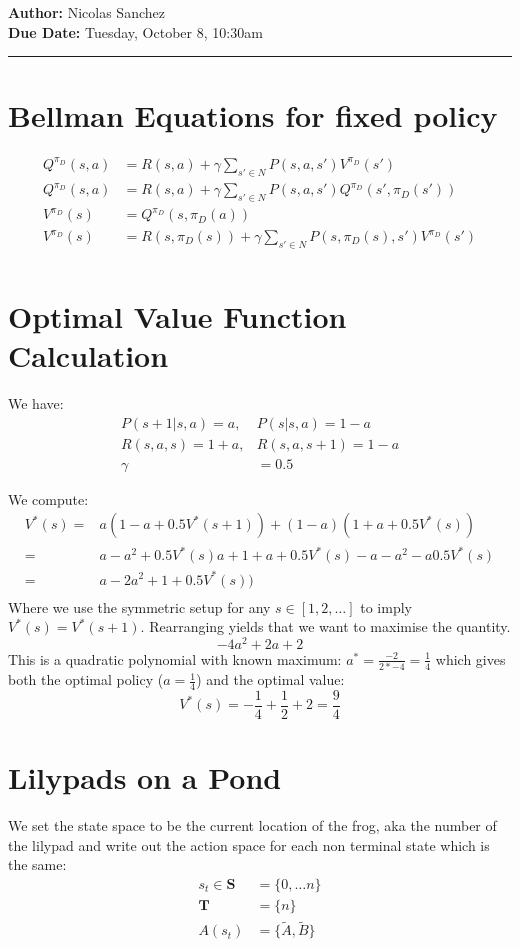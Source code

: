 \documentclass{article}[12pt]
\newcommand{\headings}[4]{\noindent {\bf Assignment 3 CME241} \hfill {{\bf Author:} Nicolas Sanchez} \\
{} \hfill {{\bf Due Date:} #2} \\

\rule[0.1in]{\textwidth}{0.025in}
}
\begin{document}
\headings{\#1}{Tuesday, October 8, 10:30am}\section{} 



\section{Bellman Equations for fixed policy}
\begin{align*}
Q^{\pi_D}(s,a) &= R(s,a) + \gamma \sum_{s'\in N} P(s,a,s')V^{\pi_D}(s')\\
Q^{\pi_D}(s,a) &= R(s,a) + \gamma \sum_{s'\in N} P(s,a,s')Q^{\pi_D}(s',\pi_D(s'))\\
V^{\pi_D}(s) &=  Q^{\pi_D}(s,\pi_D(a)) \\
V^{\pi_D}(s)  &= R(s,\pi_D(s)) + \gamma \sum_{s'\in N} P(s,\pi_D(s),s')V^{\pi_D}(s')\\
\end{align*}


\section{Optimal Value Function Calculation}

We have:
\begin{align*}
P(s+1|s,a) = a,&P(s|s,a) = 1-a\\
R(s,a,s) = 1+a,& R(s,a,s+1) = 1-a\\
\gamma &= 0.5
\end{align*}

We compute:
\begin{align*}
V^*(s) =&  a(1-a + 0.5V^*(s+1) ) + (1-a)(1+a + 0.5V^*(s)) \\
	=&a-a^2+0.5V^*(s)a + 1 + a + 0.5 V^*(s) - a - a^2-a0.5V^*(s)\\
	=&a-2a^2 + 1 + 0.5 V^*(s))\\	
\end{align*}
Where we use the symmetric setup for any $s\in[1,2,\ldots]$ to imply $V^*(s) = V^*(s+1)$. Rearranging yields that we want to maximise the quantity.
$$ -4a^2 + 2a + 2 $$
This is a quadratic polynomial with known maximum: $a^* = \frac{-2}{2*-4} = \frac{1}{4}$ which gives both the optimal policy ($a = \frac{1}{4}$) and the optimal value:
$$V^*(s) = -\frac{1}{4} + \frac{1}{2} + 2 = \frac{9}{4} $$


\section{Lilypads on a Pond}
We set the state space to be the current location of the frog, aka the number of the lilypad and write out the action space for each non terminal state which is the same:
\begin{align*}
s_t \in \mathbf{S}& =\{0,\ldots n\}\\
\mathbf{T}& = \{n\}\\
A(s_t) &= \{\tilde{A},\tilde{B}\}
\end{align*} 
\end{document}
